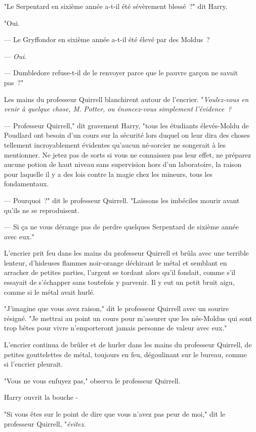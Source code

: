 "Le Serpentard en sixième année a-t-il été sévèrement blessé~?" dit Harry.

"Oui.

--- Le Gryffondor en sixième année a-t-il été élevé par des Moldus~?

--- \emph{Oui}.

--- Dumbledore refuse-t-il de le renvoyer parce que le pauvre garçon ne savait pas~?"

Les mains du professeur Quirrell blanchirent autour de l'encrier. "\emph{Voulez-vous en venir à quelque chose, M. Potter, ou énoncez-vous simplement l'évidence~?}

--- Professeur Quirrell," dit gravement Harry, "tous les étudiants élevés-Moldu de Poudlard ont besoin d'un cours sur la sécurité lors duquel on leur dira des choses tellement incroyablement évidentes qu'aucun né-sorcier ne songerait à les mentionner. Ne jetez pas de sorts si vous ne connaissez pas leur effet, ne préparez aucune potion de haut niveau sans supervision hors d'un laboratoire, la raison pour laquelle il y a des lois contre la magie chez les mineurs, tous les fondamentaux.

--- Pourquoi~?" dit le professeur Quirrell. "Laissons les imbéciles mourir avant qu'ils ne se reproduisent.

--- Si ça ne vous dérange pas de perdre quelques Serpentard de sixième année avec eux."

L'encrier prit feu dans les mains du professeur Quirrell et brûla avec une terrible lenteur, d'hideuses flammes noir-orange déchirant le métal et semblant en arracher de petites parties, l'argent se tordant alors qu'il fondait, comme s'il essayait de s'échapper sans toutefois y parvenir. Il y eut un petit bruit aigu, comme si le métal avait hurlé.

"J'imagine que vous avez raison," dit le professeur Quirrell avec un sourire résigné. "Je mettrai au point un cours pour m'assurer que les nés-Moldus qui sont trop bêtes pour vivre n'emporteront jamais personne de valeur avec eux."

L'encrier continua de brûler et de hurler dans les mains du professeur Quirrell, de petites gouttelettes de métal, toujours en feu, dégoulinant sur le bureau, comme si l'encrier pleurait.

"Vous ne vous enfuyez pas," observa le professeur Quirrell.

Harry ouvrit la bouche -

"Si vous êtes sur le point de dire que vous n'avez pas peur de moi," dit le professeur Quirrell, "\emph{évitez}.

